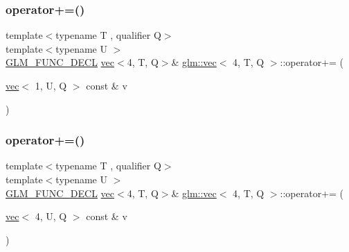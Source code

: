 \subsubsection{\texorpdfstring{operator+=()}{operator+=()}\hspace{0.1cm}{\footnotesize\ttfamily [2/6]}}
{\footnotesize\ttfamily template$<$typename T , qualifier Q$>$ \\
template$<$typename U $>$ \\
\mbox{\hyperlink{setup_8hpp_ab2d052de21a70539923e9bcbf6e83a51}{G\+L\+M\+\_\+\+F\+U\+N\+C\+\_\+\+D\+E\+CL}} \mbox{\hyperlink{structglm_1_1vec}{vec}}$<$4, T, Q$>$\& \mbox{\hyperlink{structglm_1_1vec}{glm\+::vec}}$<$ 4, T, Q $>$\+::operator+= (\begin{DoxyParamCaption}\item[{\mbox{\hyperlink{structglm_1_1vec}{vec}}$<$ 1, U, Q $>$ const \&}]{v }\end{DoxyParamCaption})}

\mbox{\label{structglm_1_1vec_3_014_00_01_t_00_01_q_01_4_a0ecc88837b973bdf129d60381e6e481c}} 
\subsubsection{\texorpdfstring{operator+=()}{operator+=()}\hspace{0.1cm}{\footnotesize\ttfamily [3/6]}}
{\footnotesize\ttfamily template$<$typename T , qualifier Q$>$ \\
template$<$typename U $>$ \\
\mbox{\hyperlink{setup_8hpp_ab2d052de21a70539923e9bcbf6e83a51}{G\+L\+M\+\_\+\+F\+U\+N\+C\+\_\+\+D\+E\+CL}} \mbox{\hyperlink{structglm_1_1vec}{vec}}$<$4, T, Q$>$\& \mbox{\hyperlink{structglm_1_1vec}{glm\+::vec}}$<$ 4, T, Q $>$\+::operator+= (\begin{DoxyParamCaption}\item[{\mbox{\hyperlink{structglm_1_1vec}{vec}}$<$ 4, U, Q $>$ const \&}]{v }\end{DoxyParamCaption})}

\mbox{\label{structglm_1_1vec_3_014_00_01_t_00_01_q_01_4_a96606ae109d8037bfb8ff43c40b25609}} 
